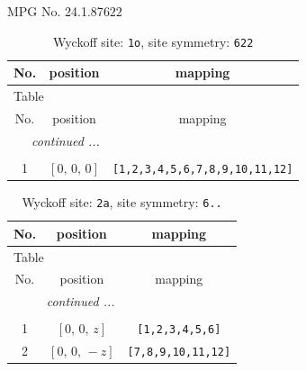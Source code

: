 \documentclass[fleqn,8pt]{jsarticle}
\begin{document}
\setcounter{MaxMatrixCols}{32}

\renewcommand{\tablename}{Table~}
\renewcommand{\figurename}{Figure~}
\begin{center}
\LARGE
MPG No. 24.1.87\quad$622$
\end{center}
\renewcommand{\arraystretch}{1.2}
\begin{longtable}{ccc}
\caption{Wyckoff site: {\tt 1o}, site symmetry: {\tt 622}}
 \\
 \hline \hline
No. & position & mapping \\ \hline \endfirsthead

\multicolumn{2}{l}{\tablename\ \thetable{}} \\
 \hline \hline
No. & position & mapping \\ \hline \endhead

 \hline \hline
\multicolumn{2}{r}{\footnotesize\it continued ...} \\ \endfoot

 \hline \hline
\multicolumn{2}{r}{} \\ \endlastfoot

1 & $\left[ 0,\, 0,\, 0 \right]$ & {\tt [1,2,3,4,5,6,7,8,9,10,11,12]} \\
\end{longtable}
\renewcommand{\arraystretch}{1.2}
\begin{longtable}{ccc}
\caption{Wyckoff site: {\tt 2a}, site symmetry: {\tt 6..}}
 \\
 \hline \hline
No. & position & mapping \\ \hline \endfirsthead

\multicolumn{2}{l}{\tablename\ \thetable{}} \\
 \hline \hline
No. & position & mapping \\ \hline \endhead

 \hline \hline
\multicolumn{2}{r}{\footnotesize\it continued ...} \\ \endfoot

 \hline \hline
\multicolumn{2}{r}{} \\ \endlastfoot

1 & $\left[ 0,\, 0,\, z \right]$ & {\tt [1,2,3,4,5,6]} \\ \hline
2 & $\left[ 0,\, 0,\, - z \right]$ & {\tt [7,8,9,10,11,12]} \\
\end{longtable}
\renewcommand{\arraystretch}{1.2}
\end{document}
